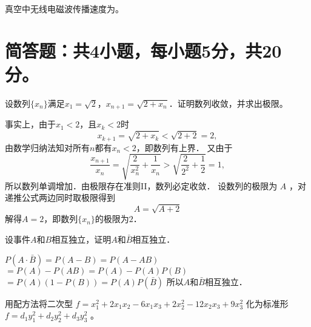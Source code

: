 \documentclass[answer=true,countunit=section,sheetsize=A3,paperprint=double,scoretable]{simplexam}
\begin{document}
{


\begin{question}
真空中无线电磁波传播速度为。	
\end{question}



}

\section{简答题：共4小题，每小题5分，共20分。}

{


%


\begin{question}
设数列$\{x_n\}$满足$x_1=\sqrt2$，$x_{n+1}=\sqrt{2+x_n}$．证明数列收敛，并求出极限。
\end{question}

\begin{solution}
事实上，由于$x_1<2$，且$x_k<2$时
\[x_{k+1}=\sqrt{2+x_k}<\sqrt{2+2}=2,\]
由数学归纳法知对所有$n$都有$x_n<2$，即数列有上界．
又由于
\[\frac{x_{n+1}}{x_n}=\sqrt{\frac{2}{x_n^2}+\frac{1}{x_n}}>\sqrt{\frac{2}{2^2}+\frac{1}{2}}=1,\]
所以数列单调增加．由极限存在准则II，数列必定收敛．
设数列的极限为 $A$ ，对递推公式两边同时取极限得到
\[A=\sqrt{A+2}\]
解得$A=2$，即数列$\{x_n\}$的极限为$2$．
\end{solution}


\begin{question}
设事件$A$和$B$相互独立，证明$A$和$\bar{B}$相互独立．
\end{question}

\begin{solution}
$P (A \cdot \bar{B}) = P (A - B) = P (A - A B)$ 
\qquad $= P (A) - P (A B) = P (A) - P (A) P (B)$ 
\qquad $= P (A) (1 - P (B)) = P (A) P (\bar{B})$ 
所以$A$和$\bar{B}$相互独立．

\answerpoints[4]%
\end{solution}


\begin{question}
用配方法将二次型 $f = x_1^2 + 2 x_1 x_2 - 6 x_1 x_3 + 2 x_2^2 - 12
x_2 x_3 + 9 x^2_3$ 化为标准形 $f = d_1 y^2_1 + d_2 y^2_2 + d_3 y^2_3$ 。
\end{question}

}
\end{document}
